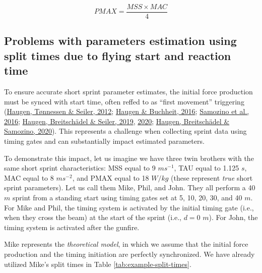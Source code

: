 \documentclass[fleqn,10pt]{wlpeerj} %
\begin{document}
\begin{equation}
  PMAX = \frac{MSS \times MAC}{4} \label{eq:relative-power}
\end{equation}

\hypertarget{problems-with-parameters-estimation-using-split-times-due-to-flying-start-and-reaction-time}{%
\subsection{Problems with parameters estimation using split times due to flying start and reaction time}\label{problems-with-parameters-estimation-using-split-times-due-to-flying-start-and-reaction-time}}

To ensure accurate short sprint parameter estimates, the initial force production must be synced with start time, often reffed to as ``first movement'' triggering (\protect\hyperlink{ref-haugenDifferenceStartImpact2012}{Haugen, Tønnessen \& Seiler, 2012}; \protect\hyperlink{ref-haugenSprintRunningPerformance2016}{Haugen \& Buchheit, 2016}; \protect\hyperlink{ref-samozinoSimpleMethodMeasuring2016}{Samozino et al., 2016}; \protect\hyperlink{ref-haugenSprintMechanicalVariables2019}{Haugen, Breitschädel \& Seiler, 2019}, \protect\hyperlink{ref-haugenSprintMechanicalProperties2020}{2020}; \protect\hyperlink{ref-haugenPowerForceVelocityProfilingSprinting2020}{Haugen, Breitschädel \& Samozino, 2020}). This represents a challenge when collecting sprint data using timing gates and can substantially impact estimated parameters.

To demonstrate this impact, let us imagine we have three twin brothers with the same short sprint characteristics: MSS equal to 9 \(ms^{-1}\), TAU equal to 1.125 \(s\), MAC equal to 8 \(ms^{-2}\), and PMAX equal to 18 \(W/kg\) (these represent \emph{true} short sprint parameters). Let us call them Mike, Phil, and John. They all perform a 40 \(m\) sprint from a standing start using timing gates set at 5, 10, 20, 30, and 40 \(m\). For Mike and Phil, the timing system is activated by the initial timing gate (i.e., when they cross the beam) at the start of the sprint (i.e., \(d=0\) \(m\)). For John, the timing system is activated after the gunfire.

Mike represents the \emph{theoretical model}, in which we assume that the initial force production and the timing initiation are perfectly synchronized. We have already utilized Mike's split times in Table \ref{tab:example-split-times}.
\end{document}
